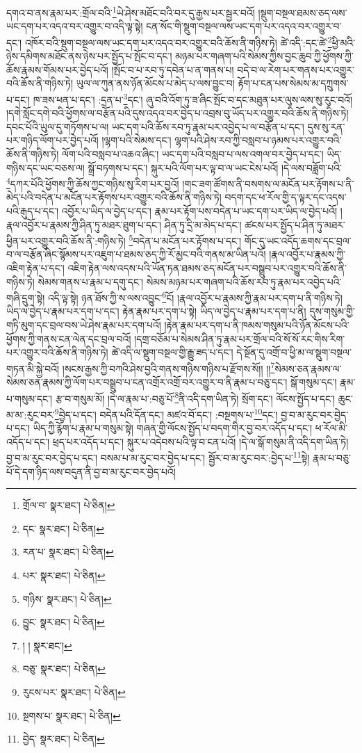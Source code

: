དགའ་བ་ནས་རྣམ་པར་:གྲོལ་བའི་\footnote{གྲོལ་བ་  སྣར་ཐང་།  པེ་ཅིན། }ཡེ་ཤེས་མཐོང་བའི་བར་དུ་རྒྱས་པར་སྦྱར་བའོ། །སྡུག་བསྔལ་ཐམས་ཅད་ལས་ཡང་དག་པར་འདའ་བར་འགྱུར་བ་འདི་ལྟ་སྟེ། ངན་སོང་གི་སྡུག་བསྔལ་ལས་ཡང་དག་པར་འདའ་བར་འགྱུར་བ་དང་། འཁོར་བའི་སྡུག་བསྔལ་ལས་ཡང་དག་པར་འདའ་བར་འགྱུར་བའི་ཆོས་ནི་གཉིས་ཏེ། ཚེ་འདི་:དང་ཚེ་\footnote{དང་  སྣར་ཐང་།  པེ་ཅིན། }ཕྱི་མའི་ཉེས་དམིགས་མཐོང་ནས་ཉེས་པར་སྤྱོད་པ་སྤོང་བ་དང་། མཉམ་པར་གཞག་པའི་སེམས་ཀྱིས་བྱང་ཆུབ་ཀྱི་ཕྱོགས་ཀྱི་ཆོས་རྣམས་གོམས་པར་བྱེད་པའོ། །སྤོང་བ་པ་རབ་ཏུ་དབེན་པ་ན་གནས་པ། བདེ་བ་ལ་རེག་པར་གནས་པར་འགྱུར་བའི་ཆོས་ནི་གཉིས་ཏེ། ཡུལ་ལ་ཀུན་ནས་ཉོན་མོངས་པ་མེད་པ་ལས་བྱུང་བ། རྟོག་པ་ངན་པས་སེམས་མ་དཀྲུགས་པ་དང་། ཁ་ཟས་ཕན་པ་དང་། :དྲན་པ་\footnote{རན་པ་  སྣར་ཐང་།  པེ་ཅིན། }དང་། ཞུ་བའི་འོག་ཏུ་ཟ་ཞིང་སྤོང་བ་དང་མཐུན་པར་ལུས་ལས་སུ་རུང་བའོ། །དགེ་སློང་དགེ་བའི་ཕྱོགས་ལ་བརྩོན་པའི་དུས་འདའ་བར་བྱེད་པ་འབྲས་བུ་ཡོད་པར་འགྱུར་བའི་ཆོས་ནི་གཉིས་ཏེ། དབང་པོའི་ཡུལ་དུ་གཏོགས་པ་ལ། ཡང་དག་པའི་ཆོས་རབ་ཏུ་རྣམ་པར་འབྱེད་པ་ལ་བརྩོན་པ་དང་། དུས་སུ་རན་པར་གཉིད་ལོག་པར་བྱེད་པའོ། །ལྷག་པའི་སེམས་དང་། ལྷག་པའི་ཤེས་རབ་ཀྱི་བསླབ་པ་ཉམས་པར་འགྱུར་བའི་ཆོས་ནི་གཉིས་ཏེ། ལོག་པའི་བསླབ་པ་འཆའ་ཞིང་། ཡང་དག་པའི་བསླབ་པ་ལས་འགལ་བར་བྱེད་པ་དང་། ཡིད་གཉིས་དང་ཡང་བཅས་ལ། སྒྲོ་བཏགས་པ་དང་། སྐུར་པའི་ལོག་པར་ལྟ་བ་ལ་ཡང་ངེས་པའོ། །དེ་ལས་བཟློག་པའི་\footnote{པར་  སྣར་ཐང་།  པེ་ཅིན། }དཀར་པོའི་ཕྱོགས་ཀྱི་ཆོས་ཀྱང་གཉིས་སུ་རིག་པར་བྱའོ། །གང་ཟག་ཚོགས་ནི་བསགས་ལ་མངོན་པར་རྟོགས་པ་ནི་མེད་པའི་བདེན་པ་མངོན་པར་རྟོགས་པར་འགྱུར་བའི་ཆོས་ནི་གཉིས་ཏེ། བདག་དང་ཕ་རོལ་གྱི་ད་ལྟར་དང་འདས་པའི་རྒུད་པ་དང་། འབྱོར་པ་ཡིད་ལ་བྱེད་པ་དང་། རྣམ་པར་རྟོག་པས་བདེན་པ་ཡང་དག་པར་ཡིད་ལ་བྱེད་པའོ། །རྣལ་འབྱོར་པ་རྣམས་ཀྱི་ཤིན་ཏུ་མཐར་ཐུག་པ་དང་། ཤིན་ཏུ་དྲི་མ་མེད་པ་དང་། ཚངས་པར་སྤྱོད་པ་ཤིན་ཏུ་མཐར་ཕྱིན་པར་འགྱུར་བའི་ཆོས་ནི་:གཉིས་ཏེ། \footnote{གཉིས་  སྣར་ཐང་།  པེ་ཅིན། }བདེན་པ་མངོན་པར་རྟོགས་པ་དང་། གོང་དུ་ཡང་འདོད་ཆགས་དང་བྲལ་བ་ལ་བརྩོན་ཞིང་སྙོམས་པར་འཇུག་པ་ཐམས་ཅད་ཀྱི་རོ་མྱང་བའི་གནས་མ་ཡིན་པའོ། །རྣལ་འབྱོར་པ་རྣམས་ཀྱི་འཇིག་རྟེན་པ་དང་། འཇིག་རྟེན་ལས་འདས་པའི་ཡོན་ཏན་ཐམས་ཅད་མངོན་པར་བསྒྲུབ་པར་འགྱུར་བའི་ཆོས་ནི་གཉིས་ཏེ། སེམས་གནས་པ་རྣམ་པ་དགུ་དང་། སེམས་མཉམ་པར་གཞག་པའི་ཆོས་རབ་ཏུ་རྣམ་པར་འབྱེད་པའི་གཞི་དྲུག་སྟེ། འདི་ལྟ་སྟེ། ཉན་ཐོས་ཀྱི་ས་ལས་འབྱུང་\footnote{བྱུང་  སྣར་ཐང་།  པེ་ཅིན། }ངོ། །རྣལ་འབྱོར་པ་རྣམས་ཀྱི་རྣམ་པར་དག་པ་ནི་གཉིས་ཏེ། ཡིད་ལ་བྱེད་པ་རྣམ་པར་དག་པ་དང་། རྟེན་རྣམ་པར་དག་པ་སྟེ། ཡིད་ལ་བྱེད་པ་རྣམ་པར་དག་པ་ནི། དུས་གསུམ་གྱི་གཏི་མུག་དང་བྲལ་བས་ཡེ་ཤེས་རྣམ་པར་དག་པའོ། །རྟེན་རྣམ་པར་དག་པ་ནི་ཁམས་གསུམ་པའི་ཉོན་མོངས་པའི་ཕྱོགས་ཀྱི་གནས་ངན་ལེན་དང་བྲལ་བའོ། །དགྲ་བཅོམ་པ་སེམས་ཤིན་ཏུ་རྣམ་པར་གྲོལ་བའི་སོ་སོ་རང་གིས་རིག་པར་འགྱུར་བའི་ཆོས་ནི་གཉིས་ཏེ། ཚེ་འདི་ལ་སྡུག་བསྔལ་གྱི་རྒྱུ་ཟད་པ་དང་། དེ་སྔོན་དུ་འགྲོ་བ་ཕྱི་མ་ལ་སྡུག་བསྔལ་གཏན་མི་སྐྱེ་བའོ། །སངས་རྒྱས་ཀྱི་བཀའི་ཤེས་བྱའི་གནས་གཉིས་གཉིས་པ་རྫོགས་སོ།། །།\footnote{། །  སྣར་ཐང་། }སེམས་ཅན་རྣམས་ལ་སེམས་ཅན་རྣམས་ཀྱི་ལོག་པར་བསྒྲུབ་པ་ངན་འགྲོར་འགྲོ་བར་འགྱུར་བ་ནི་རྣམ་པ་བཅུ་དང་། སྒོ་གསུམ་དང་། རྣམ་པ་གསུམ་དང་། རྩ་བ་གསུམ་མོ། །དེ་ལ་རྣམ་པ་:བཅུ་པོ་\footnote{བཅུ་  སྣར་ཐང་།  པེ་ཅིན། }ནི་འདི་དག་ཡིན་ཏེ། སྲོག་དང་། ལོངས་སྤྱོད་པ་དང་། ཆུང་མ་མ་:རུང་བར་\footnote{རུངས་པར་  སྣར་ཐང་།  པེ་ཅིན། }བྱེད་པ་དང་། བདེན་པའི་དོན་དང་། མཛའ་བོ་དང་། :བསྔགས་པ་\footnote{སྔགས་པ་  སྣར་ཐང་།  པེ་ཅིན། }དང་། བྱ་བ་མ་རུང་བར་བྱེད་པ་དང་། ཡིད་ཀྱི་རྙོག་པ་རྣམ་པ་གསུམ་སྟེ། གཞན་གྱི་ལོངས་སྤྱོད་པ་བདག་གིར་བྱ་བར་འདོད་པ་དང་། ཕ་རོལ་མི་འདོད་པ་དང་། ཕྲད་པར་འདོད་པ་དང་། སྐུར་པ་འདེབས་པའི་ལྟ་བ་ངན་པའོ། །དེ་ལ་སྒོ་གསུམ་ནི་འདི་དག་ཡིན་ཏེ། བྱ་བ་མ་རུང་བར་བྱེད་པ་དང་། བསམ་པ་མ་རུང་བར་བྱེད་པ་དང་། སྦྱོར་བ་མ་རུང་བར་:བྱེད་པ་\footnote{བྱེད་  སྣར་ཐང་།  པེ་ཅིན། }སྟེ། རྣམ་པ་བཅུ་པོ་དེ་དག་ཉིད་ལས་བདུན་ནི་བྱ་བ་མ་རུང་བར་བྱེད་པའོ། 